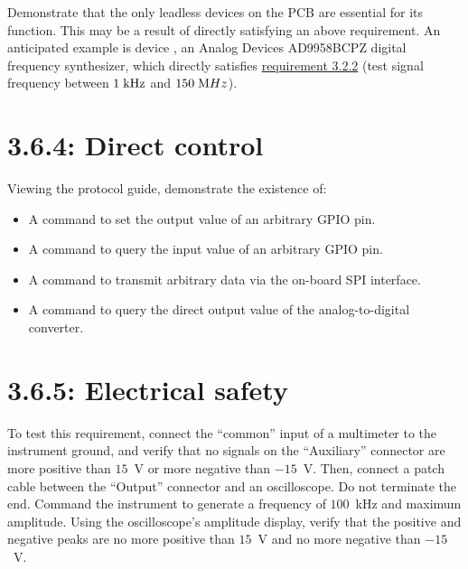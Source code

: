 Demonstrate that the only leadless devices on the PCB are essential for its function. This may be
a result of directly satisfying an above requirement. An anticipated example is device ,
an Analog Devices AD9958BCPZ digital frequency synthesizer, which directly satisfies
\hyperref[tp:3.2.2]{requirement 3.2.2} (test signal frequency between $1\;\mathrm{kHz}$ and $150\;\mathrm{M}Hz$).

\section*{3.6.4: Direct control}
Viewing the protocol guide, demonstrate the existence of:

\begin{itemize}
\item{A command to set the output value of an arbitrary GPIO pin.}
\item{A command to query the input value of an arbitrary GPIO pin.}
\item{A command to transmit arbitrary data via the on-board SPI interface.}
\item{A command to query the direct output value of the analog-to-digital converter.}
\end{itemize}

\section*{3.6.5: Electrical safety}
To test this requirement, connect the ``common'' input of a multimeter to the instrument ground, and
verify that no signals on the ``Auxiliary'' connector are more positive than $15$~V or more negative than $-15$~V.
Then, connect a patch cable between the ``Output'' connector and an oscilloscope. Do not terminate the end. Command
the instrument to generate a frequency of $100$~kHz and maximum amplitude. Using the oscilloscope's amplitude display,
verify that the positive and negative peaks are no more positive than $15$~V and no more negative than
$-15$~V.
